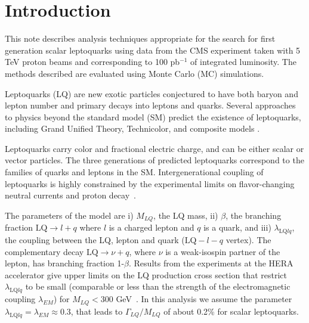 \setcounter{page}{2}%

\section{Introduction}
This note describes analysis techniques 
appropriate for the
search for first generation scalar leptoquarks 
using data from the CMS experiment taken with 5 TeV proton beams and 
corresponding to 100 pb$^{-1}$ of integrated luminosity.
The methods described are evaluated using 
Monte Carlo (MC) simulations.

%
Leptoquarks (LQ) are new exotic particles conjectured to have both baryon and lepton number 
and primary decays into leptons and quarks. 
Several approaches to physics beyond the standard model (SM) predict the existence of leptoquarks, including Grand Unified Theory, Technicolor, 
and composite models \cite{Acosta:1999ws}.  

Leptoquarks carry color and fractional electric charge, 
and can be either scalar or vector particles. The three generations of predicted leptoquarks 
correspond to the families of quarks and leptons in the SM.  Intergenerational coupling of 
leptoquarks is highly constrained by the experimental limits on flavor-changing neutral currents
and proton decay~\cite{Acosta:1999ws,Davidson:1993qk}. 


The parameters of the model are i) $M_{LQ}$, the LQ mass, ii) $\beta$, 
the branching fraction 
$\mbox{LQ} \rightarrow l + q$
where $l$ is a charged lepton and $q$ is a quark, and
iii) $\lambda_{\mbox{LQ}lq}$, the coupling between the LQ, lepton and 
quark ($\mbox{LQ}-l-q$ vertex). 
The complementary decay $\mbox{LQ} \rightarrow \nu + q$, 
where $\nu$ is a weak-isospin partner of the lepton,
has branching fraction 1-$\beta$.
Results from the experiments at the HERA accelerator
give upper limits on the LQ production cross section that restrict  
$\lambda_{\mbox{LQ}lq}$ to be small (comparable or less than the strength of 
the electromagnetic coupling $\lambda_{EM}$) for $M_{LQ}<300$ GeV~\cite{Aktas:2005pr}. 
In this analysis we assume the parameter 
$\lambda_{\mbox{LQ}lq} = \lambda_{EM} \approx 0.3$, 
that leads to $\Gamma_{LQ}/M_{LQ}$ of about 0.2\% for scalar leptoquarks. 


